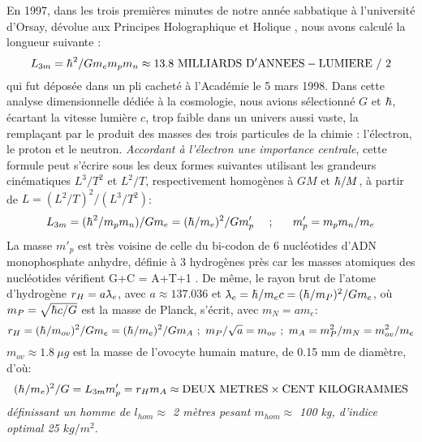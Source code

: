 \documentclass[a4paper,12pt]{article}
\renewcommand{\hbar}{{\mkern0.75mu\mathchar '26\mkern -9.75mu h}}
\newcommand{\lambdabar}{{\mkern0.75mu\mathchar '26\mkern -9.75mu\lambda}}
\begin{document}
 En 1997, dans les trois premières minutes de notre année sabbatique à l'université d'Orsay, dévolue aux Principes Holographique et Holique \citep{sanchez_1995}, nous avons calculé la longueur suivante :
\begin{equation}
    L_{3m} = \hbar^2/Gm_em_pm_n \approx 13.8 \rm{~ MILLIARDS~ D'ANNEES -LUMIERE }~/ ~2
\end{equation}
qui fut déposée dans un pli cacheté à l'Académie le 5 mars 1998. Dans cette analyse dimensionnelle dédiée à la cosmologie, nous avions sélectionné $G$ et $\hbar$, écartant la vitesse lumière $c$, trop faible dans un univers aussi vaste, la remplaçant par le produit des masses des trois particules de la chimie : l'électron, le proton et le neutron. \textit{Accordant à l'électron une importance centrale}, cette formule peut s'écrire sous les deux formes suivantes utilisant les grandeurs cinématiques $L^3/T^2$ et $L^2/T$, respectivement homogènes à $GM$ et $\hbar/M$, à partir de $L = (L^2/T)^2/(L^3/T^2)$:
\begin{equation}
    L_{3m} = (\hbar^2/m_pm_n)/{Gm_e} = (\hbar/m_e)^2/Gm'_p ~~~~;~~~~~m'_p = m_pm_n/m_e
\end{equation}
La masse $m'_p$ est très voisine de celle du bi-codon de 6 nucléotides d'ADN monophosphate anhydre, définie à 3 hydrogènes près car les masses atomiques des nucléotides vérifient G+C = A+T+1 \citep{sanchez_2024}.
De même, le rayon brut de l'atome d'hydrogène $r_H = a \lambdabar_e$, avec $a\approx 137.036$ et $\lambdabar_e = \hbar/m_e c = (\hbar/m_P)^2/Gm_e$, où $m_P = \sqrt{\hbar c /G}$ est la masse de Planck, s'écrit, avec $m_N = a m_e$:
\begin{equation}
    r_H = (\hbar/m_{ov})^2/Gm_e  = (\hbar/m_e)^2/Gm_A ~;~ m_P/\sqrt{a} = m_{ov}  ~;~m_A = m_P^2/m_N = m_{ov}^2/m_e
\end{equation}
$m_{ov} \approx 1.8~ \mu g $ est la masse de l'ovocyte humain mature, de 0.15 mm de diamètre, d'où:
\begin{equation}
     (\hbar/m_e)^2/G = L_{3m} m'_p = r_H m_A \approx \rm{DEUX}~ \rm{METRES} \times CENT~ \rm{KILOGRAMMES} 
\end{equation}
\textit{ définissant un homme de $l_{hom}\approx$ 2 mètres pesant $m_{hom}\approx$ 100 kg, d'indice optimal 25 $kg/m^2$}.
\end{document}
